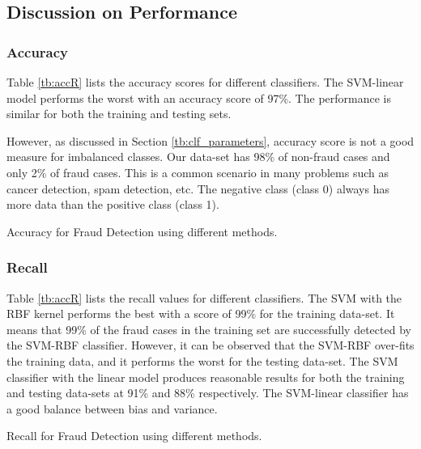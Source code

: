 \subsection{Discussion on Performance}

\subsubsection{\textbf{Accuracy}}

Table \ref{tb:accR} lists the accuracy scores for different classifiers. The SVM-linear model performs the worst with an accuracy score of 97\%. The performance is similar for both the training and testing sets.

However, as discussed in Section \ref{tb:clf_parameters}, accuracy score is not a good measure for imbalanced classes. Our data-set has 98\% of non-fraud cases and only 2\% of fraud cases. This is a common scenario in many problems such as cancer detection, spam detection, etc. The negative class (class 0) always has more data than the positive class (class 1).

\begin{table}[!ht]
\centering
{}
\caption{Accuracy for Fraud Detection using different methods.}\label{tb:accR}
\end{table}

\subsubsection{\textbf{Recall}}

Table \ref{tb:accR} lists the recall values for different classifiers. The SVM with the RBF kernel performs the best with a score of 99\% for the training data-set. It means that 99\% of the fraud cases in the training set are successfully detected by the SVM-RBF classifier. However, it can be observed that the SVM-RBF over-fits the training data, and it performs the worst for the testing data-set. The SVM classifier with the linear model produces reasonable results for both the training and testing data-sets at 91\% and 88\% respectively. The SVM-linear classifier has a good balance between bias and variance.

\begin{table}[!ht]
\centering
{}
\caption{Recall for Fraud Detection using different methods.}\label{tb:recallR}
\end{table}

